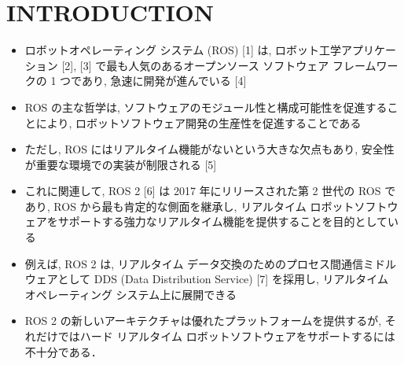 
\section{INTRODUCTION}
\label{sec: introduction}

\begin{frame}{}
    \begin{itemize}
        \item ロボットオペレーティング システム (ROS) [1] は, ロボット工学アプリケーション [2], [3] で最も人気のあるオープンソース ソフトウェア フレームワークの 1 つであり, 急速に開発が進んでいる [4]
\item ROS の主な哲学は, ソフトウェアのモジュール性と構成可能性を促進することにより, ロボットソフトウェア開発の生産性を促進することである
\item ただし, ROS にはリアルタイム機能がないという大きな欠点もあり, 安全性が重要な環境での実装が制限される [5]
\item これに関連して, ROS 2 [6] は 2017 年にリリースされた第 2 世代の ROS であり, ROS から最も肯定的な側面を継承し, リアルタイム ロボットソフトウェアをサポートする強力なリアルタイム機能を提供することを目的としている
\item 例えば, ROS 2 は, リアルタイム データ交換のためのプロセス間通信ミドルウェアとして DDS (Data Distribution Service) [7] を採用し, リアルタイム オペレーティング システム上に展開できる
\item ROS 2 の新しいアーキテクチャは優れたプラットフォームを提供するが, それだけではハード リアルタイム ロボットソフトウェアをサポートするには不十分である．
    \end{itemize}
\end{frame}

